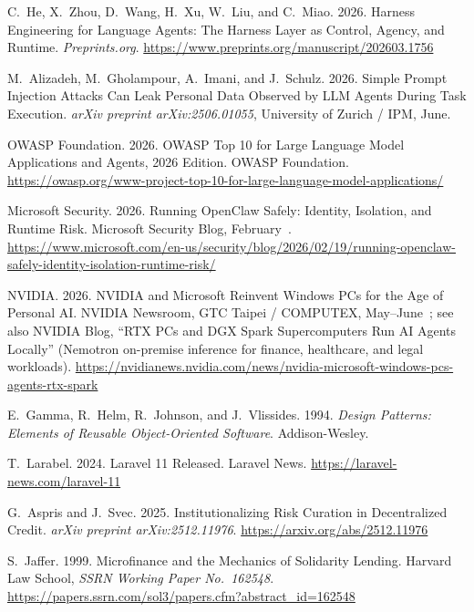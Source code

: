 \documentclass[12pt, a4paper]{report}
\begin{document}
{\begin{enumerate}[label={[\arabic*]}]
\item C.~He, X.~Zhou, D.~Wang, H.~Xu, W.~Liu, and C.~Miao. 2026. Harness Engineering for Language Agents: The Harness Layer as Control, Agency, and Runtime. \emph{Preprints.org}. \url{https://www.preprints.org/manuscript/202603.1756}

\item M.~Alizadeh, M.~Gholampour, A.~Imani, and J.~Schulz. 2026. Simple Prompt Injection Attacks Can Leak Personal Data Observed by LLM Agents During Task Execution. \emph{arXiv preprint arXiv:2506.01055}, University of Zurich / IPM, June.

\item OWASP Foundation. 2026. OWASP Top 10 for Large Language Model Applications and Agents, 2026 Edition. OWASP Foundation. \url{https://owasp.org/www-project-top-10-for-large-language-model-applications/}

\item Microsoft Security. 2026. Running OpenClaw Safely: Identity, Isolation, and Runtime Risk. Microsoft Security Blog, February~. \url{https://www.microsoft.com/en-us/security/blog/2026/02/19/running-openclaw-safely-identity-isolation-runtime-risk/}

\item NVIDIA. 2026. NVIDIA and Microsoft Reinvent Windows PCs for the Age of Personal AI. NVIDIA Newsroom, GTC Taipei / COMPUTEX, May--June~; see also NVIDIA Blog, ``RTX PCs and DGX Spark Supercomputers Run AI Agents Locally'' (Nemotron on-premise inference for finance, healthcare, and legal workloads). \url{https://nvidianews.nvidia.com/news/nvidia-microsoft-windows-pcs-agents-rtx-spark}

\item E.~Gamma, R.~Helm, R.~Johnson, and J.~Vlissides. 1994. \emph{Design Patterns: Elements of Reusable Object-Oriented Software}. Addison-Wesley.

\item T.~Larabel. 2024. Laravel 11 Released. Laravel News. \url{https://laravel-news.com/laravel-11}

\item G.~Aspris and J.~Svec. 2025. Institutionalizing Risk Curation in Decentralized Credit. \emph{arXiv preprint arXiv:2512.11976}. \url{https://arxiv.org/abs/2512.11976}

\item S.~Jaffer. 1999. Microfinance and the Mechanics of Solidarity Lending. Harvard Law School, \emph{SSRN Working Paper No.~162548}. \url{https://papers.ssrn.com/sol3/papers.cfm?abstract_id=162548}


\end{enumerate}}
\end{document}

